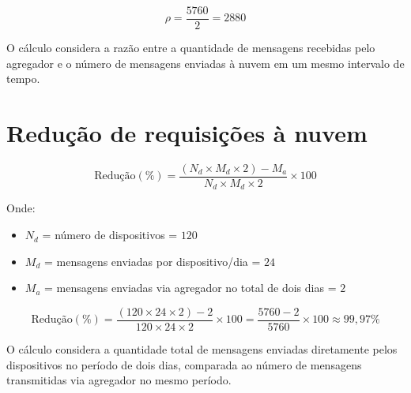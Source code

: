 \[
\rho = \frac{5760}{2} = 2880
\]

O cálculo considera a razão entre a quantidade de mensagens recebidas pelo agregador e o número de mensagens enviadas à nuvem em um mesmo intervalo de tempo.

\section{Redução de requisições à nuvem}

\[
\text{Redução}(\%) = \frac{(N_d \times M_d \times 2) - M_a}{N_d \times M_d \times 2} \times 100
\]

Onde:  
\begin{itemize}
    \item \(N_d\) = número de dispositivos = \(120\)
    \item \(M_d\) = mensagens enviadas por dispositivo/dia = \(24\)
    \item \(M_a\) = mensagens enviadas via agregador no total de dois dias = \(2\)
\end{itemize}

\[
\text{Redução}(\%) = \frac{(120 \times 24 \times 2) - 2}{120 \times 24 \times 2} \times 100
= \frac{5760 - 2}{5760} \times 100
\approx 99{,}97\%
\]

O cálculo considera a quantidade total de mensagens enviadas diretamente pelos dispositivos no período de dois dias, comparada ao número de mensagens transmitidas via agregador no mesmo período.
